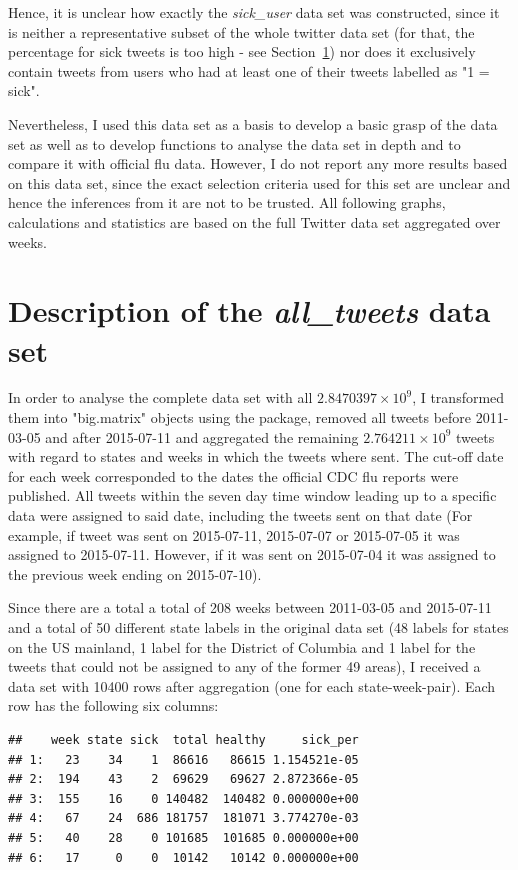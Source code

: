 \documentclass[11pt, a4paper]{report}\usepackage[]{graphicx}\usepackage[]{color}
\makeatletter
\newenvironment{kframe}{%
 \def\at@end@of@kframe{}%
 \ifinner\ifhmode%
  \def\at@end@of@kframe{\end{minipage}}%
  \begin{minipage}{\columnwidth}%
 \fi\fi%
 \def\FrameCommand##1{\hskip\@totalleftmargin \hskip-\fboxsep
 \colorbox{shadecolor}{##1}\hskip-\fboxsep
     \hskip-\linewidth \hskip-\@totalleftmargin \hskip\columnwidth}%
 \MakeFramed {\advance\hsize-\width
   \@totalleftmargin\z@ \linewidth\hsize
   \@setminipage}}%
 {\par\unskip\endMakeFramed%
 \at@end@of@kframe}
\newenvironment{knitrout}{}{} %
\makeatother
\begin{document}
Hence, it is unclear how exactly the \textit{sick\_user} data set was constructed, since it is neither a representative subset of the whole twitter data set (for that, the percentage for sick tweets is too high - see Section~\ref{sec:full_set}) nor does it exclusively contain tweets from users who had at least one of their tweets labelled as "1 = sick".

Nevertheless, I used this data set as a basis to develop a basic grasp of the data set as well as to develop functions to analyse the data set in depth and to compare it with official flu data. However, I do not report any more results based on this data set, since the exact selection criteria used for this set are unclear and hence the inferences from it are not to be trusted. All following graphs, calculations and statistics are based on the full Twitter data set aggregated over weeks. 

\section{Description of the \textit{all\_tweets} data set}
\label{sec:full_set}

In order to analyse the complete data set with all \ensuremath{2.8470397\times 10^{9}}, I transformed them into "big.matrix" objects using the  package, removed all tweets before 2011-03-05 and after 2015-07-11 and aggregated the remaining \ensuremath{2.764211\times 10^{9}} tweets with regard to states and weeks in which the tweets where sent. The cut-off date for each week corresponded to the dates the official CDC flu reports were published. All tweets within the seven day time window leading up to a specific data were assigned to said date, including the tweets sent on that date (For example, if tweet was sent on 2015-07-11, 2015-07-07 or 2015-07-05 it was assigned to 2015-07-11. However, if it was sent on 2015-07-04 it was assigned to the previous week ending on 2015-07-10).\newline

Since there are a total a total of 208 weeks between 2011-03-05 and 2015-07-11 and a total of 50 different state labels in the original data set (48 labels for states on the US mainland, 1 label for the District of Columbia and 1 label for the tweets that could not be assigned to any of the former 49 areas), I received a data set with 10400 rows after aggregation (one for each state-week-pair). Each row has the following six columns:

\begin{knitrout}
\color{fgcolor}\begin{kframe}
\begin{verbatim}
##    week state sick  total healthy     sick_per
## 1:   23    34    1  86616   86615 1.154521e-05
## 2:  194    43    2  69629   69627 2.872366e-05
## 3:  155    16    0 140482  140482 0.000000e+00
## 4:   67    24  686 181757  181071 3.774270e-03
## 5:   40    28    0 101685  101685 0.000000e+00
## 6:   17     0    0  10142   10142 0.000000e+00
\end{verbatim}
\end{kframe}
\end{knitrout}
\end{document}
